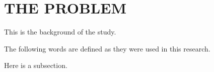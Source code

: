\chapter{THE PROBLEM}


This is the background of the study.

The following words are defined as they were used in this research.


Here is a subsection.